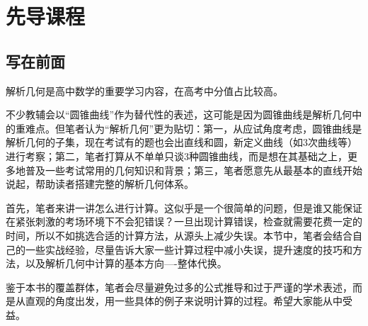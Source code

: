 \chapter{先导课程}
\section{写在前面}
解析几何是高中数学的重要学习内容，在高考中分值占比较高。

不少教辅会以“圆锥曲线”作为替代性的表述，这可能是因为圆锥曲线是解析几何中的重难点。但笔者认为“解析几何”更为贴切：第一，从应试角度考虑，圆锥曲线是解析几何的子集，现在考试有的题也会出直线和圆，新定义曲线（如3次曲线等）进行考察；第二，笔者打算从不单单只谈3种圆锥曲线，而是想在其基础之上，更多地普及一些考试常用的几何知识和背景；第三，笔者愿意先从最基本的直线开始说起，帮助读者搭建完整的解析几何体系。

首先，笔者来讲一讲怎么进行计算。这似乎是一个很简单的问题，但是谁又能保证在紧张刺激的考场环境下不会犯错误？一旦出现计算错误，检查就需要花费一定的时间，所以不如挑选合适的计算方法，从源头上减少失误。本节中，笔者会结合自己的一些实战经验，尽量告诉大家一些计算过程中减小失误，提升速度的技巧和方法，以及解析几何中计算的基本方向----整体代换。

鉴于本书的覆盖群体，笔者会尽量避免过多的公式推导和过于严谨的学术表述，而是从直观的角度出发，用一些具体的例子来说明计算的过程。希望大家能从中受益。
